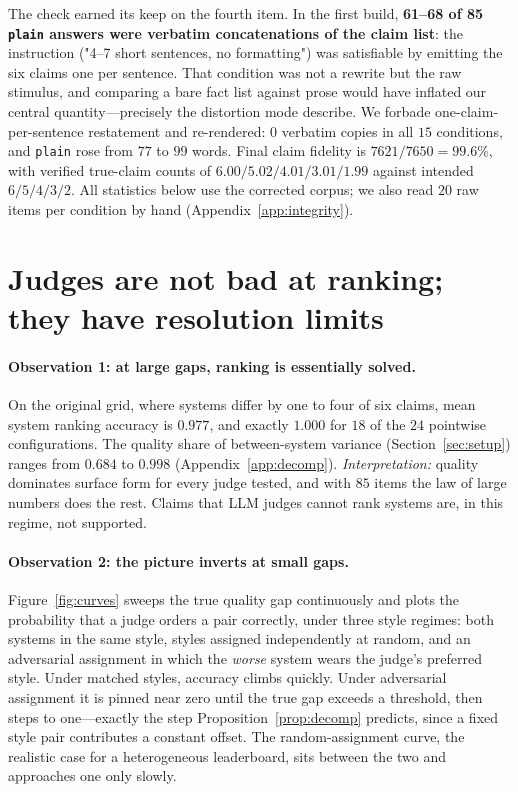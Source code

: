 \documentclass{article}
\theoremstyle{plain}
\theoremstyle{definition}
\begin{document}
The check earned its keep on the fourth item. In the first build, \textbf{61--68 of 85
\texttt{plain} answers were verbatim concatenations of the claim list}: the instruction
("4--7 short sentences, no formatting") was satisfiable by emitting the six claims one per
sentence. That condition was not a rewrite but the raw stimulus, and comparing a bare fact list
against prose would have inflated our central quantity---precisely the distortion mode
\citet{balli2026oracle} describe. We forbade one-claim-per-sentence restatement and
re-rendered: $0$ verbatim copies in all $15$ conditions, and \texttt{plain} rose from $77$ to
$99$ words. Final claim fidelity is $7621/7650=99.6\%$, with verified true-claim counts of
$6.00/5.02/4.01/3.01/1.99$ against intended $6/5/4/3/2$. All statistics below use the corrected
corpus; we also read $20$ raw items per condition by hand (Appendix~\ref{app:integrity}).

\section{Judges are not bad at ranking; they have resolution limits}
\label{sec:limits}

\paragraph{Observation 1: at large gaps, ranking is essentially solved.}
On the original grid, where systems differ by one to four of six claims, mean system ranking
accuracy is $0.977$, and exactly $1.000$ for $18$ of the $24$ pointwise configurations. The
quality share of between-system variance (Section~\ref{sec:setup}) ranges from $0.684$ to
$0.998$ (Appendix~\ref{app:decomp}). \emph{Interpretation:} quality dominates surface form for
every judge tested, and with $85$ items the law of large numbers does the rest. Claims that LLM
judges cannot rank systems are, in this regime, not supported.

\paragraph{Observation 2: the picture inverts at small gaps.}
Figure~\ref{fig:curves} sweeps the true quality gap continuously and plots the probability
that a judge orders a pair correctly, under three style regimes: both systems in the same
style, styles assigned independently at random, and an adversarial assignment in which the
\emph{worse} system wears the judge's preferred style. Under matched styles, accuracy climbs
quickly. Under adversarial assignment it is pinned near zero until the true gap exceeds a
threshold, then steps to one---exactly the step Proposition~\ref{prop:decomp} predicts, since
a fixed style pair contributes a constant offset. The random-assignment curve, the realistic
case for a heterogeneous leaderboard, sits between the two and approaches one only slowly.
\end{document}

